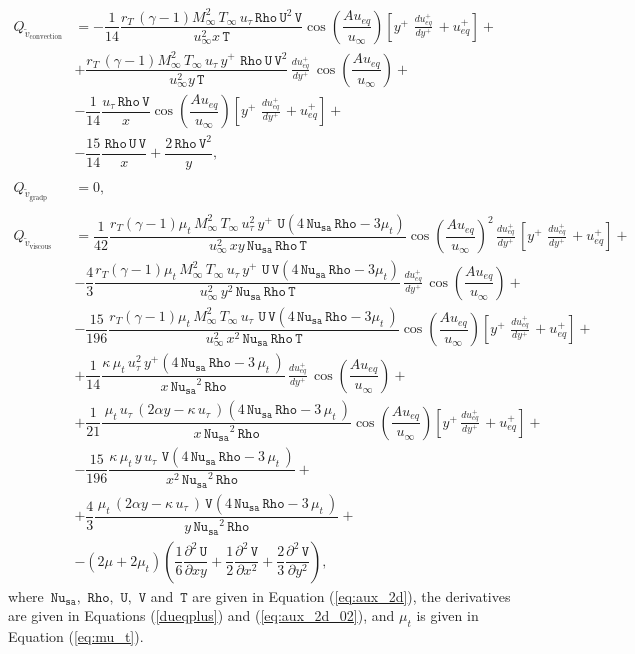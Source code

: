 \documentclass[10pt]{article}
\newcommand{\diff}[2] {\dfrac{\partial #1}{\partial #2}}
\newcommand{\Rho}{\,\mathtt{Rho}}
\newcommand{\U}{\,\mathtt{U}}
\newcommand{\V}{\,\mathtt{V}}
\newcommand{\Nu}{\,\mathtt{Nu_{sa}}}
\newcommand{\T}{\,\mathtt{T}}
\newcommand{\Dueqplusyplus}{\, \frac{du_{eq}^+}{dy^+}\,}
\newcommand{\tv}{\tilde{v}}
\begin{document}
\begin{equation}
 \begin{split}
Q_{\tv_\text{convection}} &= -\dfrac{1}{14} \dfrac{r_T \, (\gamma-1) M_{\infty}^2 \, T_{\infty} \,  u_{\tau} \Rho \U^2 \V}{u_{\infty}^2 x \T}  \cos\left(\dfrac{A u_{eq}}{u_{\infty}}\right)\left[y^{+} \, \Dueqplusyplus+u_{eq}^{+} \right]+\\
  &+ \dfrac{r_T \, (\gamma-1) M_{\infty}^2 \, T_{\infty} \,   u_{\tau} \, y^{+} \, \Rho \U \V^2 }{u_{\infty}^2 y \T}\Dueqplusyplus \cos\left(\dfrac{A u_{eq}}{u_{\infty}}\right)+\\
  &-\dfrac{1}{14} \dfrac{ u_{\tau} \Rho \V}{x}  \cos\left(\dfrac{A u_{eq}}{u_{\infty}}\right)\left[y^{+} \, \Dueqplusyplus+u_{eq}^{+} \right]+\\
  &-\dfrac{15}{14} \dfrac{\Rho \U \V}{x}+ \dfrac{2 \Rho \V^2}{y} ,\\
%
&\\
% 
 Q_{\tv_\text{gradp}} &= 0,\\
%
&\\
%
Q_{\tv_\text{viscous}} &= \dfrac{1}{42}  \dfrac{ r_T  (\gamma-1)\mu_t \, M_{\infty}^2 \, T_{\infty} \, u_{\tau}^2 \, y^{+} \, \U (4 \Nu \Rho-3 \mu_t )}{u_{\infty}^2 \, x y \Nu \Rho  \T} \cos\left(\dfrac{A u_{eq}}{u_{\infty}}\right)^2 \Dueqplusyplus\left[y^{+} \, \Dueqplusyplus+u_{eq}^{+}\right]+\\
 &-\dfrac{4}{3}  \dfrac{r_T (\gamma-1)\mu_t \, M_{\infty}^2 \, T_{\infty} \, u_{\tau} \, y^{+} \, \U \V (4 \Nu \Rho-3 \mu_t ) }{u_{\infty}^2 \, y^2 \Nu \Rho  \T} \Dueqplusyplus\cos\left(\dfrac{A u_{eq}}{u_{\infty}}\right) +\\
 &-\dfrac{15}{196}  \dfrac{ r_T (\gamma-1)\mu_t \, M_{\infty}^2 \, T_{\infty} \, u_{\tau} \, \U \V (4 \Nu \Rho-3 \mu_t \, )}{u_{\infty}^2 \, x^2 \Nu \Rho  \T} \cos\left(\dfrac{A u_{eq}}{u_{\infty}}\right)\left[y^{+} \, \Dueqplusyplus+u_{eq}^{+}\right]+\\
&+ \dfrac{1}{14}\dfrac{ \kappa \, \mu_t \, u_{\tau}^2 \, y^{+}(4 \Nu \Rho-3 \, \mu_t \, ) }{x \Nu^2 \Rho}\Dueqplusyplus \cos\left(\dfrac{A u_{eq}}{u_{\infty}} \right)+\\
&+\dfrac{1}{21}\dfrac{ \, \mu_t \, u_{\tau} \, (2 \alpha y-\kappa \, u_{\tau} \, ) (4 \Nu \Rho-3 \, \mu_t \, ) }{x \Nu^2 \Rho}\cos\left(\dfrac{A u_{eq}}{u_{\infty}} \right) \left[y^{+} \Dueqplusyplus+u_{eq}^{+}\right]+\\
&-\dfrac{15}{196}\dfrac{ \kappa \, \mu_t \, y \, u_{\tau} \, \V(4 \Nu \Rho-3 \, \mu_t \, )}{x^2 \Nu^2 \Rho}+\\
&+\dfrac{4}{3} \dfrac{\, \mu_t \, (2 \alpha y-\kappa \, u_{\tau} \, ) \V(4 \Nu \Rho-3 \, \mu_t \, ) }{y \Nu^2 \Rho}+\\	
 &-(2 \mu + 2 \mu_t) \left(\dfrac{1}{6} \diff{^2 \U}{xy}+\dfrac{1}{2}  \diff{^2 \V}{x^2}+\dfrac{2}{3} \diff{^2 \V}{y^2}\right) ,
 \end{split}	
\end{equation}
%
where $\Nu,\, \Rho,\,\U,\,\V$ and $\T$ are given in Equation (\ref{eq:aux_2d}), the derivatives are given in Equations (\ref{dueqplus}) and (\ref{eq:aux_2d_02}), and $\mu_t$ is given in Equation (\ref{eq:mu_t}).
\end{document}
